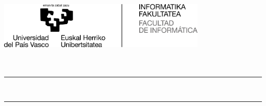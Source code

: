 \thispagestyle{empty}

\newcommand{\HRule}{\rule{\linewidth}{0.5mm}} 

\thispagestyle{empty}
\begin{center}
	
  \includegraphics[width=0.75\textwidth]{config/FacultadInformatica-Gipuzkoa-bilingue-positivo-alta.jpg} \\[2cm]
  
  
  {\LARGE \gapizenburua}\\[0.5cm]
  {\Large \ikasketak}\\[2cm]
  
  
  \HRule \\[0.5cm]
  {\LARGE 
    \textbf{\izenburua}
  }
  \HRule \\[0.5cm]

  \Large \textsl{\egilea}\\
  
   
  \vfill
  
  \textbf{\zuzendariaktestua}\\
  \zuzendariak\\[2cm]
  
  \data

\end{center}
